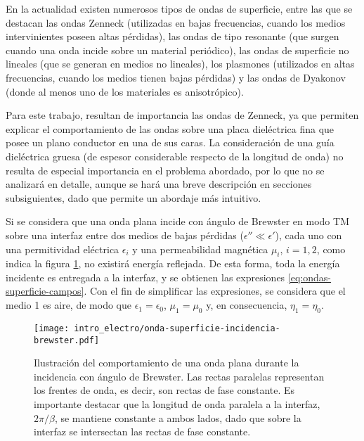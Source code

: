 En la actualidad existen numerosos tipos de ondas de superficie, entre las que se destacan las ondas Zenneck (utilizadas en bajas frecuencias, cuando los medios intervinientes poseen altas pérdidas), las ondas de tipo resonante (que surgen cuando una onda incide sobre un material periódico), las ondas de superficie no lineales (que se generan en medios no lineales), los plasmones (utilizados en altas frecuencias, cuando los medios tienen bajas pérdidas) y las ondas de Dyakonov (donde al menos uno de los materiales es anisotrópico).

Para este trabajo, resultan de importancia las ondas de Zenneck, ya que permiten explicar el comportamiento de las ondas sobre una placa dieléctrica fina que posee un plano conductor en una de sus caras. La consideración de una guía dieléctrica gruesa (de espesor considerable respecto de la longitud de onda) no resulta de especial importancia en el problema abordado, por lo que no se analizará en detalle, aunque se hará una breve descripción en secciones subsiguientes, dado que permite un abordaje más intuitivo.

Si se considera que una onda plana incide con ángulo de Brewster en modo TM sobre una interfaz entre dos medios de bajas pérdidas ($\epsilon'' \ll \epsilon'$), cada uno con una permitividad eléctrica $\epsilon_i$ y una permeabilidad magnética $\mu_i$, $i=1,2$, como indica la figura \ref{fig:onda-superficie-brewster}, no existirá energía reflejada. De esta forma, toda la energía incidente es entregada a la interfaz, y se obtienen las expresiones \ref{eq:ondas-superficie-campos}. Con el fin de simplificar las expresiones, se considera que el medio 1 es aire, de modo que $\epsilon_1 = \epsilon_0$, $\mu_1 = \mu_0$ y, en consecuencia, $\eta_1 = \eta_0$.

\begin{figure}[htp]
	\centering
	\texttt{[image: intro\_electro/onda-superficie-incidencia-brewster.pdf]}
	\caption{Ilustración del comportamiento de una onda plana durante la incidencia con ángulo de Brewster. Las rectas paralelas representan los frentes de onda, es decir, son rectas de fase constante. Es importante destacar que la longitud de onda paralela a la interfaz, $2\pi/\beta$, se mantiene constante a ambos lados, dado que sobre la interfaz se intersectan las rectas de fase constante.}
	\label{fig:onda-superficie-brewster}
\end{figure}

